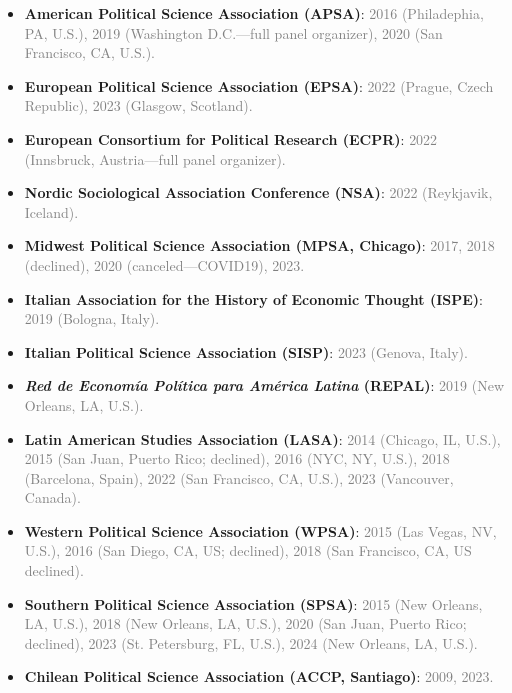 \begin{itemize}
\item[\textcolor{gray}{\textbullet}] {\bf American Political Science Association (APSA)}: \textcolor{gray}{2016 (Philadephia, PA, U.S.), 2019 (Washington D.C.---full panel organizer), 2020 (San Francisco, CA, U.S.).}
\item[\textcolor{gray}{\textbullet}] {\bf European Political Science Association (EPSA)}: \textcolor{gray}{2022 (Prague, Czech Republic), 2023 (Glasgow, Scotland).}
\item[\textcolor{gray}{\textbullet}] {\bf European Consortium for Political Research (ECPR)}: \textcolor{gray}{2022 (Innsbruck, Austria---full panel organizer).}
\item[\textcolor{gray}{\textbullet}] {\bf Nordic Sociological Association Conference (NSA)}: \textcolor{gray}{2022 (Reykjavik, Iceland).}
\item[\textcolor{gray}{\textbullet}] {\bf Midwest Political Science Association (MPSA, Chicago)}: \textcolor{gray}{2017, 2018 (declined), 2020 (canceled---COVID19), 2023.}
\item[\textcolor{gray}{\textbullet}] {\bf Italian Association for the History of Economic Thought (ISPE)}: \textcolor{gray}{2019 (Bologna, Italy).}
\item[\textcolor{gray}{\textbullet}] {\bf Italian Political Science Association (SISP)}: \textcolor{gray}{2023 (Genova, Italy).}
\item[\textcolor{gray}{\textbullet}] {\bf \emph{Red de Econom\'ia Pol\'itica para Am\'erica Latina} (REPAL)}: \textcolor{gray}{2019 (New Orleans, LA, U.S.).}
\item[\textcolor{gray}{\textbullet}] {\bf Latin American Studies Association (LASA)}: \textcolor{gray}{2014 (Chicago, IL, U.S.), 2015 (San Juan, Puerto Rico; declined), 2016 (NYC, NY, U.S.), 2018 (Barcelona, Spain), 2022 (San Francisco, CA, U.S.), 2023 (Vancouver, Canada).}
\item[\textcolor{gray}{\textbullet}] {\bf Western Political Science Association (WPSA)}: \textcolor{gray}{2015 (Las Vegas, NV, U.S.), 2016 (San Diego, CA, US; declined), 2018 (San Francisco, CA, US declined).}
\item[\textcolor{gray}{\textbullet}] {\bf Southern Political Science Association (SPSA)}: \textcolor{gray}{2015 (New Orleans, LA, U.S.), 2018 (New Orleans, LA, U.S.), 2020 (San Juan, Puerto Rico; declined), 2023 (St. Petersburg, FL, U.S.), 2024 (New Orleans, LA, U.S.).}
\item[\textcolor{gray}{\textbullet}] {\bf Chilean Political Science Association (ACCP, Santiago)}: \textcolor{gray}{2009, 2023.}


\end{itemize}
